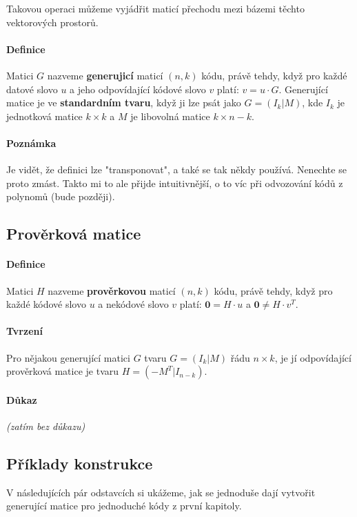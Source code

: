 \documentclass[a4paper,12pt]{article}
\begin{document}
Takovou operaci můžeme vyjádřit maticí přechodu mezi bázemi těchto vektorových 
prostorů. 

\paragraph{Definice}
Matici $G$ nazveme \textbf{generujicí} maticí $(n,k)$ kódu, právě tehdy, když 
pro každé datové slovo $u$ a jeho odpovídající kódové slovo $v$ platí: $v = 
u\cdot G$.  Generující matice je ve \textbf{standardním tvaru}, když ji lze psát 
jako $G=(I_k|M)$, kde $I_k$ je jednotková matice $k \times k$ a $M$ je libovolná 
matice $k \times n-k$.

\paragraph{Poznámka}
Je vidět, že definici lze "transponovat", a také se tak někdy používá.  Nenechte 
se proto zmást. Takto mi to ale přijde intuitivnější, o to víc při odvozování 
kódů z polynomů (bude později).

\subsection{Prověrková matice}
\paragraph{Definice}
Matici $H$ nazveme \textbf{prověrkovou} maticí $(n,k)$ kódu, právě tehdy, když 
pro každé kódové slovo $u$ a nekódové slovo $v$ platí: $\mathbf{0} = H \cdot u$ 
a $\mathbf{0} \neq H \cdot v^T$.
\paragraph{Tvrzení}
Pro nějakou generující matici $G$ tvaru $G = (I_k | M)$ řádu $n \times k$, je jí 
odpovídající prověrková matice je tvaru $H = (-M^T | I_{n-k})$.
\paragraph{Důkaz} \textit{(zatím bez důkazu)}

\subsection{Příklady konstrukce}
V následujících pár odstavcích si ukážeme, jak se jednoduše dají vytvořit 
generující matice pro jednoduché kódy z první kapitoly.
\end{document}
